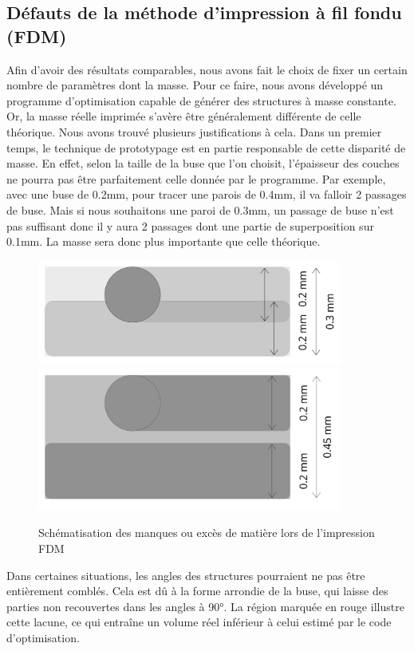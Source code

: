 \documentclass[a4paper]{article}
\begin{document}
	\subsection{Défauts de la méthode d'impression à fil fondu (FDM)}
	\label{pb_fdm} \label{buses}
	\hspace{0.5cm}Afin d’avoir des résultats comparables, nous avons fait le choix de fixer un certain nombre de paramètres dont la masse. 
	Pour ce faire, nous avons développé un programme d’optimisation capable de générer des structures à masse constante. Or, la masse réelle imprimée s’avère être généralement différente de celle théorique. Nous avons trouvé plusieurs justifications à cela. 
	Dans un premier temps, le technique de prototypage est en partie responsable de cette disparité de masse. En effet, selon la taille de la buse que l’on choisit, l’épaisseur des couches ne pourra pas être parfaitement celle donnée par le programme. 
	Par exemple, avec une buse de 0.2mm, pour tracer une parois de 0.4mm, il va falloir 2 passages de buse. Mais si nous souhaitons une paroi de 0.3mm, un passage de buse n’est pas suffisant donc il y aura 2 passages dont une partie de superposition sur 0.1mm. La masse sera donc plus importante que celle théorique.
	
	\begin{figure}[H]
		\centering
		\includegraphics[width=10cm, angle=-90]{Images/9/0.3mm.pdf}
		\includegraphics[width=10cm, angle=-90]{Images/9/0.45mm.pdf}\\
		\caption{Schématisation des manques ou excès de matière lors de l’impression FDM}
	\end{figure}
	
	Dans certaines situations, les angles des structures pourraient ne pas être entièrement comblés. Cela est dû à la forme arrondie de la buse, qui laisse des parties non recouvertes dans les angles à 90°. La région marquée en rouge illustre cette lacune, ce qui entraîne un volume réel inférieur à celui estimé par le code d'optimisation.\\
	
\end{document}

